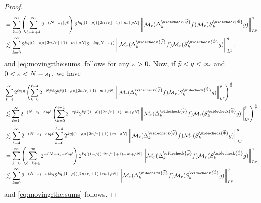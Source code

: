 \begin{proof}
\begin{align*}
&= \sum_{k=0}^{\infty} \left(\sum_{\ell=k+4}^\infty 2^{-(N-s_1) q \ell} \right)  2^{k q [(1-\rho)( \lfloor{2n/r}\rfloor + 1) + m+\rho N]}   \norm{\mathcal{M}_r(\Delta^{\widecheck{\widetilde{\f}}}_k f)\mathcal{M}_r(S^{\widecheck{\widetilde{\Phi}}}_k g)}{L^p}^q \\
& \lesssim \sum\limits_{k=0}^\infty  2^{k q [(1-\rho)( \lfloor{2n/r}\rfloor + 1) + m+\rho N]} 2^{-kq(N-s_1)}   \norm{\mathcal{M}_r(\Delta^{\widecheck{\widetilde{\f}}}_k f)\mathcal{M}_r(S^{\widecheck{\widetilde{\Phi}}}_k g)}{L^p}^q,
\end{align*}
and \eqref{eq:moving:the:sums} follows for any $\varepsilon>0.$ Now, if $\tilde{p}<q <\infty$ and $0<\varepsilon < N - s_1,$ we have
\begin{align*}
& \sum\limits_{\ell=4}^\infty   2^{\ell  s_1 q} \left(  \sum\limits_{k=0}^{\ell -4} 2^{- N \pst \ell} 2^{k \pst [(1-\rho)( \lfloor{2n/r}\rfloor + 1) +m+\rho N]}   \norm{\mathcal{M}_r(\Delta^{\widecheck{\widetilde{\f}}}_k f)\mathcal{M}_r(S^{\widecheck{\widetilde{\Phi}}}_k g)}{L^p}^{\pst}\right)^\frac{q}{\pst} \\
& \lesssim \sum\limits_{\ell=4}^\infty 2^{-  (N- s_1 - \eps) q \ell}  \left(  \sum\limits_{k=0}^{\ell -4} 2^{-\eps \pst k} 2^{k \pst [(1-\rho)( \lfloor{2n/r}\rfloor + 1) + m+\rho N]}   \norm{\mathcal{M}_r(\Delta^{\widecheck{\widetilde{\f}}}_k f)\mathcal{M}_r(S^{\widecheck{\widetilde{\Phi}}}_k g)}{L^p}^{\pst}\right)^\frac{q}{\pst}\\
\end{align*}
\begin{align*}
& \lesssim  \sum\limits_{\ell=4}^\infty 2^{-  (N- s_1 - \eps) q \ell} \sum\limits_{k=0}^{\ell -4} 2^{k q [(1-\rho)( \lfloor{2n/r}\rfloor + 1) + m+\rho N]}   \norm{\mathcal{M}_r(\Delta^{\widecheck{\widetilde{\f}}}_k f)\mathcal{M}_r(S^{\widecheck{\widetilde{\Phi}}}_k g)}{L^p}^q \\
& =  \sum\limits_{k=0}^\infty \left( \sum\limits_{\ell=k+4}^{\infty} 2^{- (N- s_1 - \eps) q \ell} \right) 2^{k q [(1-\rho)( \lfloor{2n/r}\rfloor + 1) + m+\rho N]}   \norm{\mathcal{M}_r(\Delta^{\widecheck{\widetilde{\f}}}_k f)\mathcal{M}_r(S^{\widecheck{\widetilde{\Phi}}}_k g)}{L^p}^q \\
& \lesssim \sum\limits_{k=0}^\infty  2^{- (N- s_1 - \eps) kq } 2^{k q [(1-\rho)( \lfloor{2n/r}\rfloor + 1) + m+\rho N]}   \norm{\mathcal{M}_r(\Delta^{\widecheck{\widetilde{\f}}}_k f)\mathcal{M}_r(S^{\widecheck{\widetilde{\Phi}}}_k g)}{L^p}^q 
\end{align*}
and \eqref{eq:moving:the:sums} follows.


\end{proof}
